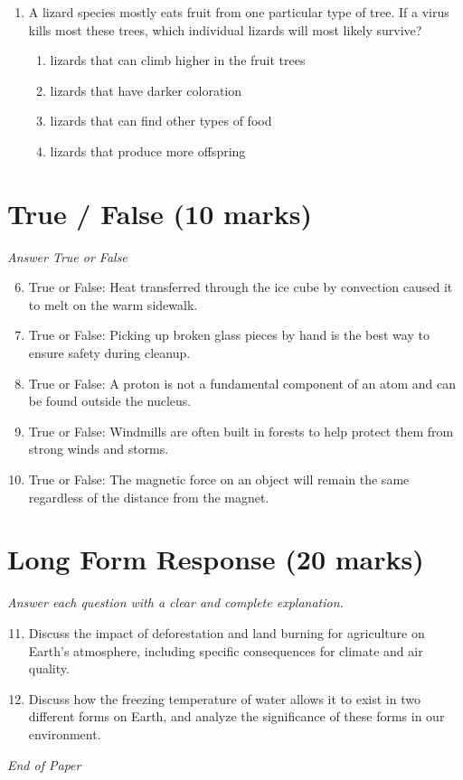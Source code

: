 \documentclass[12pt]{article}
\begin{document}
\begin{enumerate}[label=\arabic*.]
\begin{enumerate}[label=(\alph*)]
    \item the source that created the sound
    \item the distance between molecules in the medium
\end{enumerate}
\item A lizard species mostly eats fruit from one particular type of tree. If a virus kills most
these trees, which individual lizards will most likely survive?
\begin{enumerate}[label=(\alph*)]
    \item lizards that can climb higher in the fruit trees
    \item lizards that have darker coloration
    \item lizards that can find other types of food
    \item lizards that produce more offspring
\end{enumerate}
\end{enumerate}

\section*{True / False (10 marks)}
\textit{Answer True or False}
\begin{enumerate}[label=\arabic*.]
\setcounter{enumi}{5}
\item True or False: Heat transferred through the ice cube by convection caused it to melt on the warm sidewalk.
\item True or False: Picking up broken glass pieces by hand is the best way to ensure safety during cleanup.
\item True or False: A proton is not a fundamental component of an atom and can be found outside the nucleus.
\item True or False: Windmills are often built in forests to help protect them from strong winds and storms.
\item True or False: The magnetic force on an object will remain the same regardless of the distance from the magnet.
\end{enumerate}

\section*{Long Form Response (20 marks)}
\textit{Answer each question with a clear and complete explanation.}
\begin{enumerate}[label=\arabic*.]
\setcounter{enumi}{10}
\item Discuss the impact of deforestation and land burning for agriculture on Earth's
atmosphere, including specific consequences for climate and air quality.
\item Discuss how the freezing temperature of water allows it to exist in two different forms on
Earth, and analyze the significance of these forms in our environment.
\end{enumerate}

\vfill
\noindent\textit{End of Paper}
\end{document}
